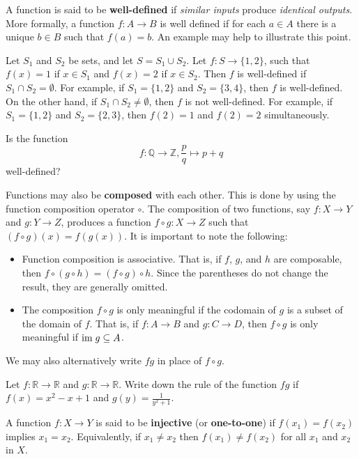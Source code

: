 A function is said to be \textbf{well-defined} if \textit{similar inputs} produce \textit{identical outputs}. More formally, a function $f: A \to B$ is well defined if for each $a \in A$ there is a unique $b \in B$ such that $f(a) = b$. An example may help to illustrate this point.
\begin{example}
    Let $S_1$ and $S_2$ be sets, and let $S = S_1 \cup S_2$. Let $f: S \to \{1, 2\}$, such that $f(x) = 1$ if $x \in S_1$ and $f(x) = 2$ if $x \in S_2$. Then $f$ is well-defined if $S_1 \cap S_2 = \emptyset$. For example, if $S_1 = \{1, 2\}$ and $S_2 = \{3, 4\}$, then $f$ is well-defined. On the other hand, if $S_1 \cap S_2 \neq \emptyset$, then $f$ is not well-defined. For example, if $S_1 = \{1, 2\}$ and $S_2 = \{2, 3\}$, then $f(2) = 1$ and $f(2) = 2$ simultaneously.
\end{example}
\begin{exercise}
    Is the function
    \[
        f: \mathbb{Q} \to \mathbb{Z}, \frac pq \mapsto p + q    
    \]
    well-defined?
\end{exercise}

Functions may also be \textbf{composed} with each other. This is done by using the function composition operator $\circ$. The composition of two functions, say $f: X \to Y$ and $g: Y \to Z$, produces a function $f \circ g: X \to Z$ such that $(f \circ g)(x) = f(g(x))$. It is important to note the following:
\begin{itemize}
    \item Function composition is associative. That is, if $f$, $g$, and $h$ are composable, then $f \circ (g \circ h) = (f \circ g) \circ h$. Since the parentheses do not change the result, they are generally omitted.
    \item The composition $f \circ g$ is only meaningful if the codomain of $g$ is a subset of the domain of $f$. That is, if $f: A \to B$ and $g: C \to D$, then $f \circ g$ is only meaningful if $\mathrm{im}\; g \subseteq A$.
\end{itemize}
We may also alternatively write $fg$ in place of $f \circ g$.

\begin{exercise}
    Let $f: \mathbb{R} \to \mathbb{R}$ and $g: \mathbb{R} \to \mathbb{R}$. Write down the rule of the function $fg$ if $f(x) = x^2 - x + 1$ and $g(y) = \frac1{y^2+1}$.
\end{exercise}

A function $f: X \to Y$ is said to be \textbf{injective} (or \textbf{one-to-one}) if $f(x_1) = f(x_2)$ implies $x_1 = x_2$. Equivalently, if $x_1 \neq x_2$ then $f(x_1) \neq f(x_2)$ for all $x_1$ and $x_2$ in $X$.

